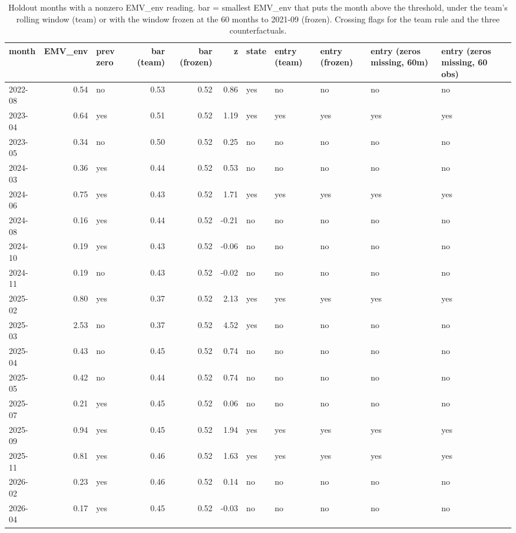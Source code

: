 \begin{table}
\caption{Holdout months with a nonzero EMV\_env reading. bar = smallest EMV\_env that puts the month above the threshold, under the team's rolling window (team) or with the window frozen at the 60 months to 2021-09 (frozen). Crossing flags for the team rule and the three counterfactuals.}
\label{tab:m1_holdout_nonzero}
\begin{tabular}{lrlrrrlllll}
\toprule
month & EMV\_env & prev zero & bar (team) & bar (frozen) & z & state & entry (team) & entry (frozen) & entry (zeros missing, 60m) & entry (zeros missing, 60 obs) \\
\midrule
2022-08 & 0.54 & no & 0.53 & 0.52 & 0.86 & yes & no & no & no & no \\
2023-04 & 0.64 & yes & 0.51 & 0.52 & 1.19 & yes & yes & yes & yes & yes \\
2023-05 & 0.34 & no & 0.50 & 0.52 & 0.25 & no & no & no & no & no \\
2024-03 & 0.36 & yes & 0.44 & 0.52 & 0.53 & no & no & no & no & no \\
2024-06 & 0.75 & yes & 0.43 & 0.52 & 1.71 & yes & yes & yes & yes & yes \\
2024-08 & 0.16 & yes & 0.44 & 0.52 & -0.21 & no & no & no & no & no \\
2024-10 & 0.19 & yes & 0.43 & 0.52 & -0.06 & no & no & no & no & no \\
2024-11 & 0.19 & no & 0.43 & 0.52 & -0.02 & no & no & no & no & no \\
2025-02 & 0.80 & yes & 0.37 & 0.52 & 2.13 & yes & yes & yes & yes & yes \\
2025-03 & 2.53 & no & 0.37 & 0.52 & 4.52 & yes & no & no & no & no \\
2025-04 & 0.43 & no & 0.45 & 0.52 & 0.74 & no & no & no & no & no \\
2025-05 & 0.42 & no & 0.44 & 0.52 & 0.74 & no & no & no & no & no \\
2025-07 & 0.21 & yes & 0.45 & 0.52 & 0.06 & no & no & no & no & no \\
2025-09 & 0.94 & yes & 0.45 & 0.52 & 1.94 & yes & yes & yes & yes & yes \\
2025-11 & 0.81 & yes & 0.46 & 0.52 & 1.63 & yes & yes & yes & yes & yes \\
2026-02 & 0.23 & yes & 0.46 & 0.52 & 0.14 & no & no & no & no & no \\
2026-04 & 0.17 & yes & 0.45 & 0.52 & -0.03 & no & no & no & no & no \\
\bottomrule
\end{tabular}
\end{table}
